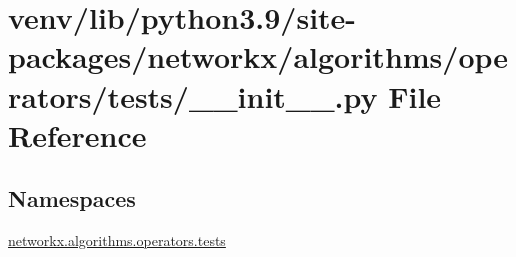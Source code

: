 \hypertarget{venv_2lib_2python3_89_2site-packages_2networkx_2algorithms_2operators_2tests_2____init_____8py}{}\section{venv/lib/python3.9/site-\/packages/networkx/algorithms/operators/tests/\+\_\+\+\_\+init\+\_\+\+\_\+.py File Reference}
\label{venv_2lib_2python3_89_2site-packages_2networkx_2algorithms_2operators_2tests_2____init_____8py}
\subsection*{Namespaces}
\begin{DoxyCompactItemize}
\item 
 \hyperlink{namespacenetworkx_1_1algorithms_1_1operators_1_1tests}{networkx.\+algorithms.\+operators.\+tests}
\end{DoxyCompactItemize}
